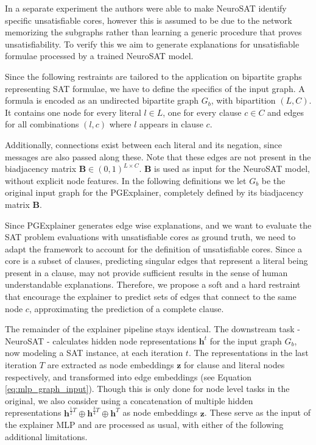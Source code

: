 In a separate experiment the authors were able to make NeuroSAT identify specific unsatisfiable cores, however this is assumed to be due to the network memorizing the subgraphs rather than learning a generic procedure that proves unsatisfiability. To verify this we aim to generate explanations for unsatisfiable formulae processed by a trained NeuroSAT model.

Since the following restraints are tailored to the application on bipartite graphs representing SAT formulae, we have to define the specifics of the input graph. A formula is encoded as an undirected bipartite graph $G_b$, with bipartition $(L,C)$. It contains one node for every literal $l \in L$, one for every clause $c \in C$ and edges for all combinations $(l,c)$ where $l$ appears in clause $c$. 

Additionally, connections exist between each literal and its negation, since messages are also passed along these. Note that these edges are not present in the biadjacency matrix $\mathbf{B}\in (0,1)^{L\times C}$. $\mathbf{B}$ is used as input for the NeuroSAT model, without explicit node features. In the following definitions we let $G_b$ be the original input graph for the PGExplainer, completely defined by its biadjacency matrix $\mathbf{B}$. \bigskip


Since PGExplainer generates edge wise explanations, and we want to evaluate the SAT problem evaluations with unsatisfiable cores as ground truth, we need to adapt the framework to account for the definition of unsatisfiable cores. Since a core is a subset of clauses, predicting singular edges that represent a literal being present in a clause, may not provide sufficient results in the sense of human understandable explanations. Therefore, we propose a soft and a hard restraint that encourage the explainer to predict sets of edges that connect to the same node $c$, approximating the prediction of a complete clause.

The remainder of the explainer pipeline stays identical. The downstream task - NeuroSAT - calculates hidden node representations $\mathbf{h}^t$ for the input graph $G_b$, now modeling a SAT instance, at each iteration $t$. The representations in the last iteration $T$ are extracted as node embeddings $\mathbf{z}$ for clause and literal nodes respectively, and transformed into edge embeddings (see Equation \ref{eq:mlp_graph_input}). Though this is only done for node level tasks in the original, we also consider using a concatenation of multiple hidden representations $\mathbf{h}^{\frac{1}{2}T} \oplus \mathbf{h}^{\frac{3}{4}T} \oplus \mathbf{h}^T$ as node embeddings $\mathbf{z}$. These serve as the input of the explainer MLP and are processed as usual, with either of the following additional limitations. \bigskip


